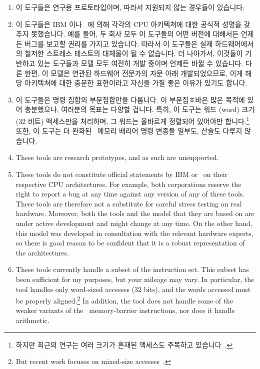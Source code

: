 \begin{enumerate}
\item	이 도구들은 연구용 프로토타입이며, 따라서 지원되지 않는 경우들이
	있습니다.
\item	이 도구들은 IBM 이나 \ARM\ 에 의해 각각의 CPU 아키텍쳐에 대한 공식적
	성명을 갖추지 못했습니다.
	예를 들어, 두 회사 모두 이 도구들의 어떤 버전에 대해서든 언제든 버그를
	보고할 권리를 가지고 있습니다.
	따라서 이 도구들은 실제 하드웨어에서의 철저한 스트레스 테스트의
	대체물이 될 수 없습니다.
	더 나아가서, 이것들이 기반하고 있는 도구들과 모델 모두 여전히 개발
	중이며 언제든 바뀔 수 있습니다.
	다른 한편, 이 모델은 연관된 하드웨어 전문가의 자문 아래 개발되었으므로,
	이게 해당 아키텍쳐에 대한 충분한 표현이라고 자신을 가질 좋은 이유가
	있기도 합니다.
\item	이 도구들은 명령 집합의 부분집합만을 다룹니다.
	이 부분집ㅎ바은 많은 목적에 있어 충분했으나, 여러분의 목표는 다양할
	겁니다.
	특히, 이 도구는 워드 (word) 크기 (32 비트) 액세스만을 처리하며, 그
	워드는 올바르게 정렬되어 있어야만 합니다.\footnote{
		하지만 최근의 연구는 여러 크기가 혼재된 액세스도 주목하고
		있습니다~\cite{Flur:2017:MCA:3093333.3009839}.}
	또한, 이 도구는 더 완화된 \ARM\ 메모리 배리어 명령 변종들 일부도,
	산술도 다루지 않습니다.

\iffalse

\item	These tools are research prototypes, and as such are unsupported.
\item	These tools do not constitute official statements by IBM or \ARM\
	on their respective CPU architectures. For example, both
	corporations reserve the right to report a bug at any time against
	any version of any of these tools. These tools are therefore not a
	substitute for careful stress testing on real hardware. Moreover,
	both the tools and the model that they are based on are under
	active development and might change at any time. On the other
	hand, this model was developed in consultation with the relevant
	hardware experts, so there is good reason to be confident that
	it is a robust representation of the architectures.
\item	These tools currently handle a subset of the instruction set.
	This subset has been sufficient for my purposes, but your mileage
	may vary. In particular, the tool handles only word-sized accesses
	(32 bits), and the words accessed must be properly aligned.\footnote{
		But recent work focuses on mixed-size
		accesses~\cite{Flur:2017:MCA:3093333.3009839}.}
	In addition, the tool does not handle some of the weaker variants
	of the \ARM\ memory-barrier instructions, nor does it handle
	arithmetic.


\end{enumerate}
